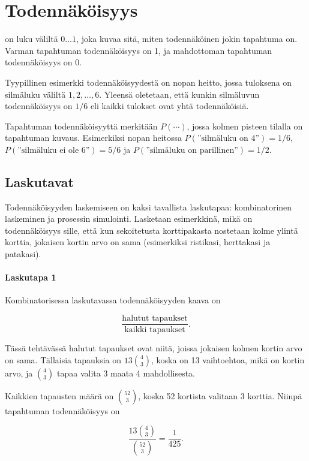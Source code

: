\chapter{Todennäköisyys}


 on luku väliltä $0 \ldots 1$,
joka kuvaa sitä, miten todennäköinen jokin
tapahtuma on.
Varman tapahtuman todennäköisyys on 1,
ja mahdottoman tapahtuman todennäköisyys on 0.

Tyypillinen esimerkki todennäköisyydestä
on nopan heitto, jossa tuloksena
on silmäluku väliltä $1,2,\ldots,6$.
Yleensä oletetaan, että kunkin silmäluvun
todennäköisyys on $1/6$
eli kaikki tulokset ovat yhtä todennäköisiä.

Tapahtuman todennäköisyyttä merkitään $P(\cdots)$,
jossa kolmen pisteen tilalla on tapahtuman kuvaus.
Esimerkiksi nopan heitossa
$P(\textrm{''silmäluku on 4''})=1/6$,
$P(\textrm{''silmäluku ei ole 6''})=5/6$
ja $P(\textrm{''silmäluku on parillinen''})=1/2$.

\section{Laskutavat}

Todennäköisyyden laskemiseen on kaksi
tavallista laskutapaa:
kombinatorinen laskeminen ja prosessin simulointi.
Lasketaan esimerkkinä, mikä on todennäköisyys sille,
että kun sekoitetusta korttipakasta nostetaan
kolme ylintä korttia, jokaisen kortin arvo on sama
(esimerkiksi ristikasi, herttakasi ja patakasi).

\subsubsection*{Laskutapa 1}

Kombinatorisessa laskutavassa
todennäköisyyden kaava on

\[\frac{\textrm{halutut tapaukset}}{\textrm{kaikki tapaukset}}.\]

Tässä tehtävässä halutut tapaukset ovat niitä,
joissa jokaisen kolmen kortin arvo on sama.
Tällaisia tapauksia on $13 {4 \choose 3}$,
koska on 13 vaihtoehtoa, mikä on kortin arvo,
ja ${4 \choose 3}$ tapaa valita 3 maata 4 mahdollisesta.

Kaikkien tapausten määrä on ${52 \choose 3}$,
koska 52 kortista valitaan 3 korttia.
Niinpä tapahtuman todennäköisyys on

\[\frac{13 {4 \choose 3}}{{52 \choose 3}} = \frac{1}{425}.\]

